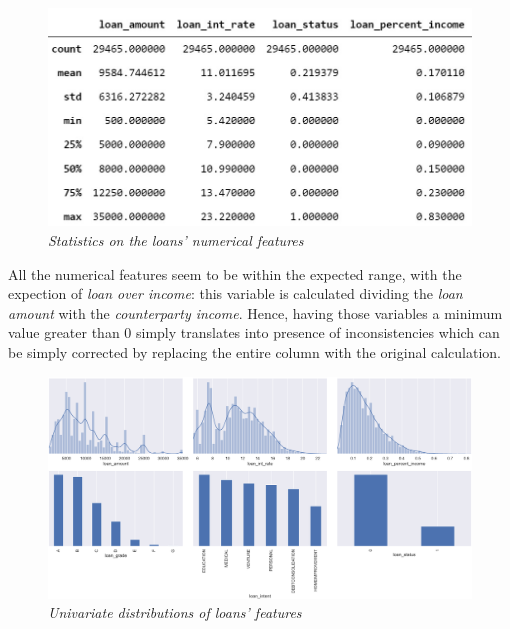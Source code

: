 \documentclass[a4paper,12pt]{article}
\begin{document}
        \begin{figure}[H]
            \centerline{
                \includegraphics[width=\linewidth]{./images/loans_dataset_describe.jpg}
            }
            \caption{\textit{Statistics on the loans' numerical features}}
            \label{fig:loans_describe}
        \end{figure}

    All the numerical features seem to be within the expected range, with the expection of \textit{loan over income}:
    this variable is calculated dividing the \textit{loan amount} with the \textit{counterparty income}. Hence, having 
    those variables a minimum value greater than 0 simply translates into presence of inconsistencies which can be simply 
    corrected by replacing the entire column with the original calculation.
    
        \begin{figure}[H]
            \centerline{
                \includegraphics[width=\linewidth]{./images/loans_univariate.png}
            }
            \caption{\textit{Univariate distributions of loans' features}}
            \label{fig:loans_univariate}
        \end{figure}
\end{document}
